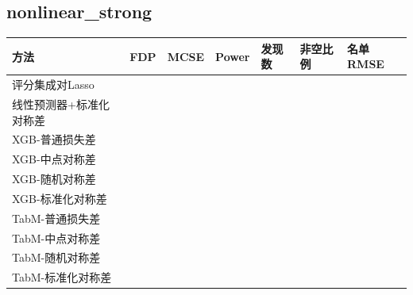 \documentclass[UTF8,11pt,a4paper]{ctexart}
\begin{document}
\subsection{nonlinear\_strong}\label{nonlinear_strong}

{\def\LTcaptype{none} %
{
\footnotesize
\begin{longtable}[]{@{}
  >{\raggedright\arraybackslash}p{}
  >{\raggedright\arraybackslash}p{}
  >{\raggedright\arraybackslash}p{}
  >{\raggedright\arraybackslash}p{}
  >{\raggedright\arraybackslash}p{}
  >{\raggedright\arraybackslash}p{}
  >{\raggedright\arraybackslash}p{}@{}}
\toprule\noalign{}
\begin{minipage}[b]{\linewidth}\raggedright
方法
\end{minipage} & \begin{minipage}[b]{\linewidth}\raggedright
FDP
\end{minipage} & \begin{minipage}[b]{\linewidth}\raggedright
MCSE
\end{minipage} & \begin{minipage}[b]{\linewidth}\raggedright
Power
\end{minipage} & \begin{minipage}[b]{\linewidth}\raggedright
发现数
\end{minipage} & \begin{minipage}[b]{\linewidth}\raggedright
非空比例
\end{minipage} & \begin{minipage}[b]{\linewidth}\raggedright
名单RMSE
\end{minipage} \\
\midrule\noalign{}
\endhead
\bottomrule\noalign{}
\endlastfoot
评分集成对Lasso & 0.0981 & 0.0182 & 0.1180 & 2.03 & 0.26 & 1.1743 \\
线性预测器+标准化对称差 & 0.0760 & 0.0169 & 0.0870 & 1.44 & 0.20 & 1.1842 \\
XGB-普通损失差 & 0.1946 & 0.0157 & 0.9980 & 12.97 & 1.00 & 0.8528 \\
XGB-中点对称差 & 0.1619 & 0.0135 & 0.9990 & 12.31 & 1.00 & 0.8533 \\
XGB-随机对称差 & 0.1879 & 0.0149 & 0.9990 & 12.78 & 1.00 & 0.8539 \\
XGB-标准化对称差 & 0.1701 & 0.0151 & 0.9240 & 11.72 & 1.00 & 0.8693 \\
TabM-普通损失差 & 0.1765 & 0.0159 & 0.9670 & 12.33 & 1.00 & 0.8585 \\
TabM-中点对称差 & 0.1808 & 0.0151 & 0.9570 & 12.20 & 1.00 & 0.8599 \\
TabM-随机对称差 & 0.1732 & 0.0155 & 0.9650 & 12.19 & 1.00 & 0.8589 \\
TabM-标准化对称差 & 0.1668 & 0.0166 & 0.7940 & 10.26 & 0.95 & 0.9021 \\
\end{longtable}
}
}
\end{document}
